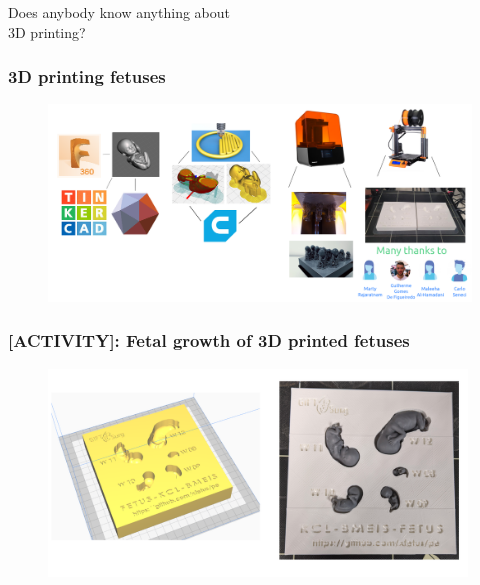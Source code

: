 {
\begin{frame}{}

\BigSizeFont
\begin{center}
    Does anybody know anything about \\ 3D printing?
\end{center}

\end{frame}
}


{
\begin{frame}
  \frametitle{3D printing fetuses}
  \vspace{10pt}
        \begin{figure}
        \centering
        \includegraphics[width=1.0\textwidth]{./../figures/3d-printing/why-and-how/versions/drawing-v05.png}
      \end{figure}

\end{frame}
}

{
\begin{frame}
  \frametitle{[\faUsers ACTIVITY]: Fetal growth of 3D printed fetuses}
  \vspace{10pt}
        \begin{figure}
        \centering
        \includegraphics[width=0.99\textwidth]{./../figures/3d-printing/cads-prints/versions/drawing-v02.png}
      \end{figure}

\end{frame}
}

